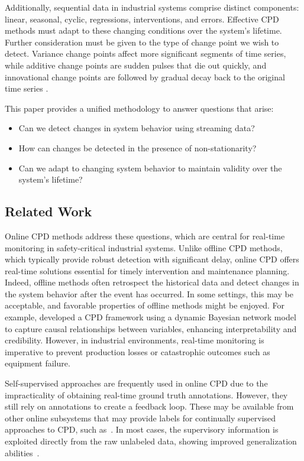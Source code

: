Additionally, sequential data in industrial systems comprise distinct components: linear, seasonal, cyclic, regressions, interventions, and errors. Effective CPD methods must adapt to these changing conditions over the system's lifetime. Further consideration must be given to the type of change point we wish to detect. Variance change points affect more significant segments of time series, while additive change points are sudden pulses that die out quickly, and innovational change points are followed by gradual decay back to the original time series \citep{Srivastava2017}.

This paper provides a unified methodology to answer questions that arise:
\begin{itemize}
	\item Can we detect changes in system behavior using streaming data?
	\item How can changes be detected in the presence of non-stationarity?
	\item Can we adapt to changing system behavior to maintain validity over the system's lifetime?
\end{itemize}

\subsection{Related Work}
Online CPD methods address these questions, which are central for real-time monitoring in safety-critical industrial systems. Unlike offline CPD methods, which typically provide robust detection with significant delay, online CPD offers real-time solutions essential for timely intervention and maintenance planning. Indeed, offline methods often retrospect the historical data and detect changes in the system behavior after the event has occurred. In some settings, this may be acceptable, and favorable properties of offline methods might be enjoyed. For example, \citet{Liu2022} developed a CPD framework using a dynamic Bayesian network model to capture causal relationships between variables, enhancing interpretability and credibility. However, in industrial environments, real-time monitoring is imperative to prevent production losses or catastrophic outcomes such as equipment failure.

Self-supervised approaches are frequently used in online CPD due to the impracticality of obtaining real-time ground truth annotations. However, they still rely on annotations to create a feedback loop. These may be available from other online subsystems that may provide labels for continually supervised approaches to CPD, such as~\cite{Korycki2021}. In most cases, the supervisory information is exploited directly from the raw unlabeled data, showing improved generalization abilities~\citep{Zhang2024}.  %

